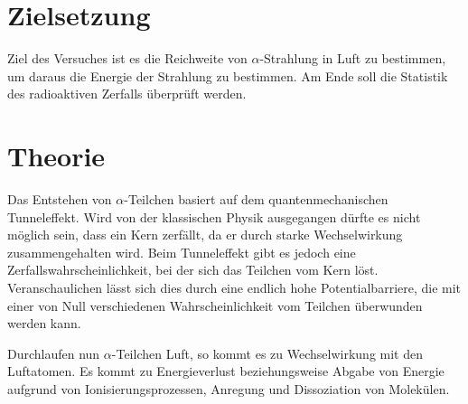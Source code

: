 \section{Zielsetzung}
\label{sec:Zielsetzung}

Ziel des Versuches ist es die Reichweite von $\alpha$-Strahlung in Luft zu bestimmen, um daraus die Energie der Strahlung zu bestimmen.  Am Ende soll die Statistik des radioaktiven Zerfalls überprüft werden.

\section{Theorie}
\label{sec:Theorie}

Das Entstehen von $\alpha$-Teilchen basiert auf dem quantenmechanischen Tunneleffekt. Wird von der klassischen Physik ausgegangen dürfte es nicht möglich sein, dass ein Kern zerfällt, da er durch starke Wechselwirkung
zusammengehalten wird. Beim Tunneleffekt gibt es jedoch eine Zerfallswahrscheinlichkeit, bei der sich das Teilchen vom Kern löst. Veranschaulichen lässt sich dies  durch eine endlich hohe Potentialbarriere, die mit einer
von Null verschiedenen Wahrscheinlichkeit vom Teilchen überwunden werden kann.

Durchlaufen nun $\alpha$-Teilchen Luft, so kommt es zu Wechselwirkung mit den Luftatomen. Es kommt zu Energieverlust beziehungsweise Abgabe von Energie aufgrund von Ionisierungsprozessen, Anregung und Dissoziation von Molekülen. 


